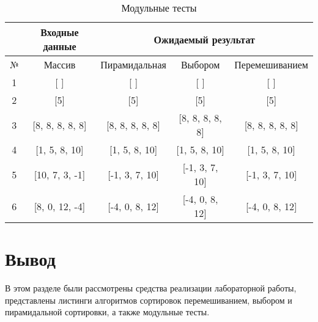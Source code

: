 \begin{table}[h]
	\begin{center}
        \begin{threeparttable}
        \captionsetup{justification=raggedright,singlelinecheck=off}
		\caption{\label{tbl:tests} Модульные тесты}
		\begin{tabular}{|c|c|c|c|c|}
			\hline
			&Входные данные& \multicolumn{3}{c|}{Ожидаемый результат} \\
			\hline
			№&Массив&Пирамидальная&Выбором&Перемешиванием \\
			\hline
            1&[ ]&[ ]&[ ]&[ ] \\
            \hline
            2&[5]&[5]&[5]&[5] \\
            \hline
            3&[8, 8, 8, 8, 8]&[8, 8, 8, 8, 8]&[8, 8, 8, 8, 8]&[8, 8, 8, 8, 8] \\
            \hline
            4&[1, 5, 8, 10]&[1, 5, 8, 10]&[1, 5, 8, 10]&[1, 5, 8, 10] \\
			\hline
			5&[10, 7, 3, -1]&[-1, 3, 7, 10]&[-1, 3, 7, 10]&[-1, 3, 7, 10] \\
			\hline
            6&[8, 0, 12, -4]&[-4, 0, 8, 12]&[-4, 0, 8, 12]&[-4, 0, 8, 12] \\
			\hline
		\end{tabular}
        \end{threeparttable}
	\end{center}
\end{table}

\section*{Вывод}

В этом разделе были рассмотрены средства реализации лабораторной работы, представлены листинги алгоритмов сортировок перемешиванием, выбором и пирамидальной сортировки, а также модульные тесты.
